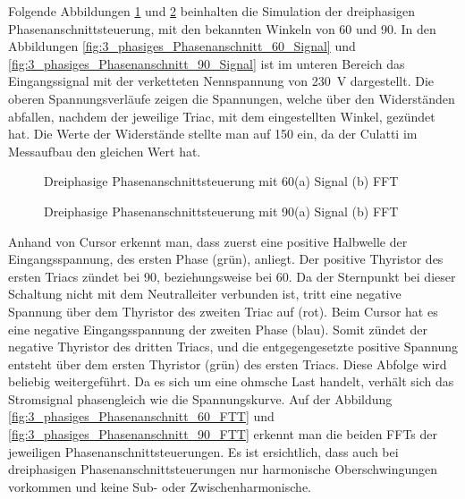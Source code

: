 Folgende Abbildungen \ref{fig:dreiphasige_Phasenanschnittsteuerung_mit_60} und \ref{fig:dreiphasige_Phasenanschnittsteuerung_mit_90} beinhalten die Simulation der dreiphasigen Phasenanschnittsteuerung, mit den bekannten Winkeln von 60\textdegree\hspace{0.02cm} und 90\textdegree\hspace{0.02cm}.
In den Abbildungen \ref{fig:3_phasiges_Phasenanschnitt_60_Signal} und \ref{fig:3_phasiges_Phasenanschnitt_90_Signal} ist im  unteren Bereich das Eingangssignal mit der verketteten Nennspannung von \SI{230}{V} dargestellt. Die oberen Spannungsverläufe zeigen die Spannungen, welche über den Widerständen abfallen, nachdem der jeweilige Triac, mit dem eingestellten Winkel, gezündet hat. Die Werte der Widerstände stellte man auf \SI{150}{\Omega} ein, da der Culatti im Messaufbau den gleichen Wert hat. 
\newpage
\begin{figure}[ht!]
	\centering
	\qquad
	\caption{Dreiphasige Phasenanschnittsteuerung mit 60\textdegree (a) Signal (b) FFT}
	\label{fig:dreiphasige_Phasenanschnittsteuerung_mit_60}
\end{figure}


\begin{figure}[ht!]
	\centering
	\qquad
	\caption{Dreiphasige Phasenanschnittsteuerung mit 90\textdegree (a) Signal (b) FFT}
	\label{fig:dreiphasige_Phasenanschnittsteuerung_mit_90}
\end{figure}
Anhand von Cursor  erkennt man, dass zuerst eine positive Halbwelle der Eingangsspannung, des ersten Phase (grün), anliegt. Der positive Thyristor des ersten Triacs zündet bei 90\textdegree, beziehungsweise bei 60\textdegree\hspace{0.02cm}. Da der Sternpunkt bei dieser Schaltung nicht mit dem Neutralleiter verbunden ist, tritt eine negative Spannung über dem Thyristor des zweiten Triac auf (rot). Beim Cursor  hat es eine negative Eingangsspannung der zweiten Phase (blau). Somit zündet der negative Thyristor des dritten Triacs, und die entgegengesetzte positive Spannung entsteht über dem ersten Thyristor (grün) des ersten Triacs. Diese Abfolge wird beliebig weitergeführt. Da es sich um eine ohmsche Last handelt, verhält sich das Stromsignal phasengleich wie die Spannungskurve. Auf der Abbildung \ref{fig:3_phasiges_Phasenanschnitt_60_FTT} und \ref{fig:3_phasiges_Phasenanschnitt_90_FTT} erkennt man die beiden  FFTs der jeweiligen Phasenanschnittsteuerungen. Es ist ersichtlich, dass auch bei dreiphasigen Phasenanschnittsteuerungen nur harmonische Oberschwingungen vorkommen und keine Sub- oder Zwischenharmonische. 

